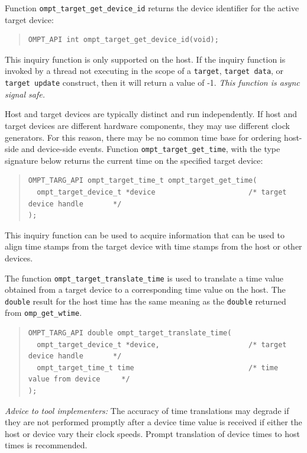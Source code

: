 \documentclass{article}
\begin{document}
Function \verb|ompt_target_get_device_id| returns the device identifier for the active target device:
\begin{quote}
\begin{verbatim}
OMPT_API int ompt_target_get_device_id(void);
\end{verbatim}
\end{quote}
This inquiry function is only supported on the host. If the inquiry function is invoked by a thread not executing in the scope of a {\tt target}, {\tt target data}, or {\tt target update} construct, then it will return a value of -1. {\it This function is async signal safe.}

Host and target devices are typically distinct and run independently. If 
host and target devices are different hardware components, they may 
use different clock generators. For this reason,  there may be no common time base for ordering host-side and device-side events.
Function \verb|ompt_target_get_time|, with the type signature below returns the current time on the specified target device:
\begin{quote}
\begin{verbatim}
OMPT_TARG_API ompt_target_time_t ompt_target_get_time(
  ompt_target_device_t *device                      /* target device handle       */
);
\end{verbatim}
\end{quote}
This inquiry function can be used
to acquire information that can be used to align time stamps from the target device with time
stamps from the host or other devices.

The function \verb|ompt_target_translate_time| is used to translate a time value obtained from a target device to a corresponding time value on the host. The {\tt double} result for the host time has the same meaning as the {\tt double} returned from \verb|omp_get_wtime|.
\begin{quote}
\begin{verbatim}
OMPT_TARG_API double ompt_target_translate_time(
  ompt_target_device_t *device,                     /* target device handle       */
  ompt_target_time_t time                           /* time value from device     */
);
\end{verbatim}
\end{quote}
\noindent
{\em Advice to tool implementers:} The accuracy of time translations may degrade if they are not performed promptly after a device time value is received if either the host or device vary their clock speeds. Prompt translation of device times to host times is recommended.
\end{document}
